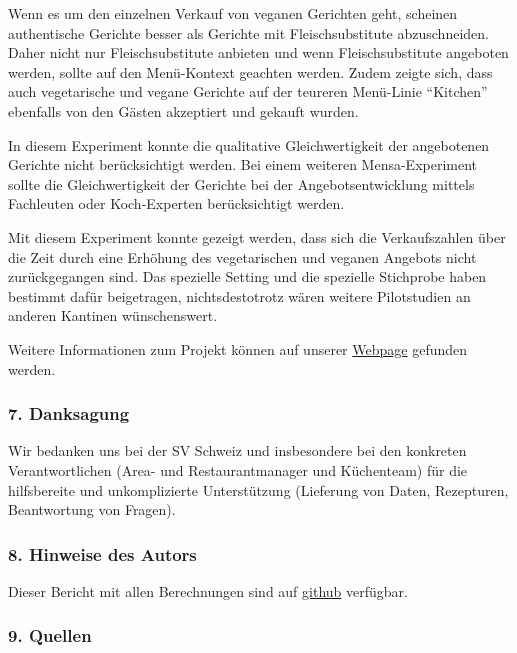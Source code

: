 \documentclass[12pt,ngerman,]{article}
\begin{document}
\par

Wenn es um den einzelnen Verkauf von veganen Gerichten geht, scheinen
authentische Gerichte besser als Gerichte mit Fleischsubstitute
abzuschneiden. Daher nicht nur Fleischsubstitute anbieten und wenn
Fleischsubstitute angeboten werden, sollte auf den Menü-Kontext geachten
werden. Zudem zeigte sich, dass auch vegetarische und vegane Gerichte
auf der teureren Menü-Linie ``Kitchen'' ebenfalls von den Gästen
akzeptiert und gekauft wurden.

\par

In diesem Experiment konnte die qualitative Gleichwertigkeit der
angebotenen Gerichte nicht berücksichtigt werden. Bei einem weiteren
Mensa-Experiment sollte die Gleichwertigkeit der Gerichte bei der
Angebotsentwicklung mittels Fachleuten oder Koch-Experten berücksichtigt
werden.

\par

Mit diesem Experiment konnte gezeigt werden, dass sich die
Verkaufszahlen über die Zeit durch eine Erhöhung des vegetarischen und
veganen Angebots nicht zurückgegangen sind. Das spezielle Setting und
die spezielle Stichprobe haben bestimmt dafür beigetragen,
nichtsdestotrotz wären weitere Pilotstudien an anderen Kantinen
wünschenswert.

Weitere Informationen zum Projekt können auf unserer
\href{novanimal.ch}{Webpage} gefunden werden.

\hypertarget{danksagung}{%
\subsubsection{7. Danksagung}\label{danksagung}}

Wir bedanken uns bei der SV Schweiz und insbesondere bei den konkreten
Verantwortlichen (Area- und Restaurantmanager und Küchenteam) für die
hilfsbereite und unkomplizierte Unterstützung (Lieferung von Daten,
Rezepturen, Beantwortung von Fragen).

\hypertarget{hinweise-des-autors}{%
\subsubsection{8. Hinweise des Autors}\label{hinweise-des-autors}}

Dieser Bericht mit allen Berechnungen sind auf
\href{https://github.com/GAEgeler/tilldata_2017}{github} verfügbar.

\hypertarget{quellen}{%
\subsubsection{9. Quellen}\label{quellen}}
\end{document}
